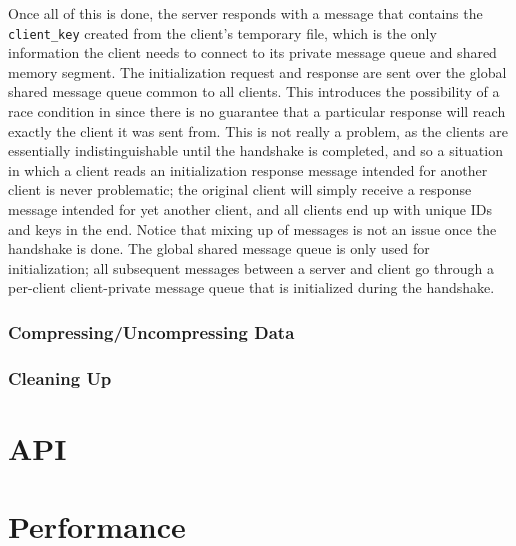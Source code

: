 \documentclass[paper=a4, fontsize=11pt]{scrartcl} %
\numberwithin{equation}{section} %
\numberwithin{figure}{section} %
\numberwithin{table}{section} %
\begin{document}
Once all of this is done, the server responds with a message that contains the \texttt{client\_key} created from the client's temporary file, which is the only information the client needs to connect to its private message queue and shared memory segment. The initialization request and response are sent over the global shared message queue common to all clients. This introduces the possibility of a race condition in since there is no guarantee that a particular response will reach exactly the client it was sent from. This is not really a problem, as the clients are essentially indistinguishable until the handshake is completed, and so a situation in which a client reads an initialization response message intended for another client is never problematic; the original client will simply receive a response message intended for yet another client, and all clients end up with unique IDs and keys in the end. Notice that mixing up of messages is not an issue once the handshake is done. The global shared message queue is only used for initialization; all subsequent messages between a server and client go through a per-client client-private message queue that is initialized during the handshake.

\subsubsection{Compressing/Uncompressing Data}

\subsubsection{Cleaning Up}


\section{API}
\section{Performance}
\end{document}

